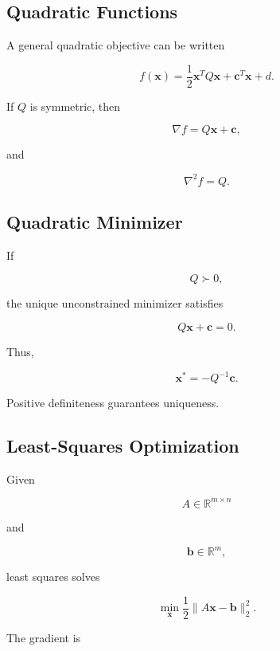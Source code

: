 \subsection{Quadratic Functions}
\label{subsec:quadratic-objectives}

A general quadratic objective can be written

\[
\boxed{
f(\mathbf{x})
=
\frac12
\mathbf{x}^TQ\mathbf{x}
+
\mathbf{c}^T\mathbf{x}
+
d.
}
\]

If \(Q\) is symmetric, then

\[
\boxed{
\nabla f
=
Q\mathbf{x}
+
\mathbf{c},
}
\]

and

\[
\boxed{
\nabla^2f
=
Q.
}
\]

\subsection{Quadratic Minimizer}
\label{subsec:quadratic-minimizer}

If

\[
Q\succ0,
\]

the unique unconstrained minimizer satisfies

\[
Q\mathbf{x}+\mathbf{c}=0.
\]

Thus,

\[
\boxed{
\mathbf{x}^*
=
-Q^{-1}\mathbf{c}.
}
\]

Positive definiteness guarantees uniqueness.

\subsection{Least-Squares Optimization}
\label{subsec:least-squares-optimization}

Given

\[
A\in\mathbb{R}^{m\times n}
\]

and

\[
\mathbf{b}\in\mathbb{R}^m,
\]

least squares solves

\[
\boxed{
\min_{\mathbf{x}}
\frac12
\|
A\mathbf{x}-\mathbf{b}
\|_2^2.
}
\]

The gradient is

